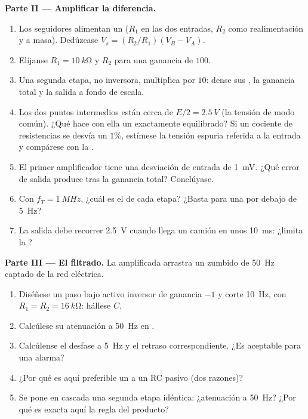 \begin{problem}
\medskip
\noindent\textbf{Parte II --- Amplificar la diferencia.}
\begin{enumerate}[resume]
  \item Los seguidores alimentan un  ($R_1$ en las
        dos entradas, $R_2$ como realimentación y a masa). Dedúzcase $V_s =
        (R_2/R_1)(V_B - V_A)$.
  \item Elíjanse $R_1 = \qty{10}{k\ohm}$ y $R_2$ para una ganancia de $100$.
  \item Una segunda etapa, no inversora, multiplica por $10$: dense sus
        , la ganancia total y la salida a fondo de escala.
  \item Los dos puntos intermedios están cerca de $E/2 = \qty{2.5}{V}$ (la
        tensión de modo común). ¿Qué hace con ella un  exactamente equilibrado? Si un cociente de resistencias
        se desvía un $1\%$, estímese la tensión espuria referida a la
        entrada y compárese con la .
  \item El primer amplificador tiene una desviación de entrada de
        \qty{1}{mV}. ¿Qué error de salida produce tras la ganancia total?
        Conclúyase.
  \item Con $f_T = \qty{1}{MHz}$, ¿cuál es el  de cada
        etapa? ¿Basta para una  por debajo de \qty{5}{Hz}?
  \item La salida debe recorrer \qty{2.5}{V} cuando llega un camión en
        unos \qty{10}{ms}: ¿limita la ?
\end{enumerate}

\medskip
\noindent\textbf{Parte III --- El filtrado.}
La  amplificada arrastra un zumbido de \qty{50}{Hz} captado de la red
eléctrica.
\begin{enumerate}[resume]
  \item Diséñese un paso bajo activo inversor de ganancia $-1$ y corte
        \qty{10}{Hz}, con $R_1 = R_2 = \qty{16}{k\ohm}$: hállese $C$.
  \item Calcúlese su atenuación a \qty{50}{Hz} en .
  \item Calcúlense el desfase a \qty{5}{Hz} y el retraso correspondiente.
        ¿Es aceptable para una alarma?
  \item ¿Por qué es aquí preferible un  a un RC pasivo (dos
        razones)?
  \item Se pone en cascada una segunda etapa idéntica: ¿atenuación a
        \qty{50}{Hz}? ¿Por qué es exacta aquí la regla del producto?
\end{enumerate}


\end{problem}
